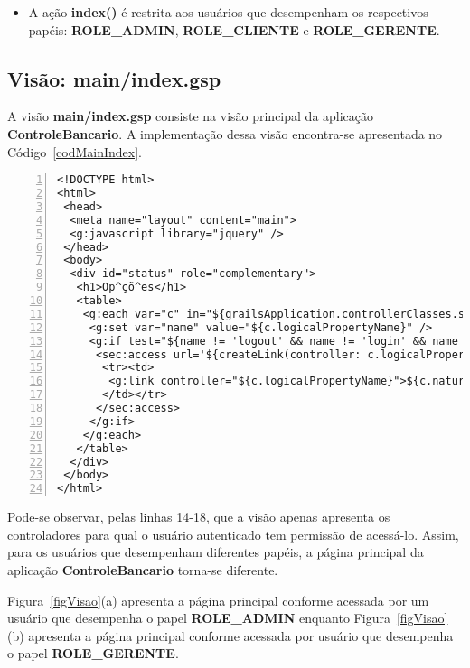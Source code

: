 \begin{itemize}

\item  A  ação  {\bf  index()}  é  restrita  aos  usuários  que  desempenham  os
  respectivos   papéis:   {\bf   ROLE\_ADMIN},   {\bf  ROLE\_CLIENTE}   e   {\bf
    ROLE\_GERENTE}.  

\end{itemize}

\subsection{Visão: main/index.gsp}

\vspace{0.5cm}

A  visão {\bf  main/index.gsp} consiste  na  visão principal  da aplicação  {\bf
  ControleBancario}.   A implementação  dessa visão  encontra-se  apresentada no
Código~\ref{codMainIndex}.  

\lstset{language=XML}
\begin{lstlisting}[numbers=left, caption=Visão {\bf main/index.gsp}, frame=trBL,
    float=htbp, label=codMainIndex] 
<!DOCTYPE html>
<html>
 <head>
  <meta name="layout" content="main">
  <g:javascript library="jquery" />
 </head>
 <body>
  <div id="status" role="complementary">
   <h1>Op^çõ^es</h1>
   <table>
    <g:each var="c" in="${grailsApplication.controllerClasses.sort { it.fullName } }">
     <g:set var="name" value="${c.logicalPropertyName}" />
     <g:if test="${name != 'logout' && name != 'login' && name != 'main'}">
      <sec:access url='${createLink(controller: c.logicalPropertyName, base: "/")}'>
       <tr><td>    
        <g:link controller="${c.logicalPropertyName}">${c.naturalName.replace(" Controller","")}</g:link>
       </td></tr>
      </sec:access>
     </g:if>
    </g:each>
   </table>
  </div>
 </body>
</html>
\end{lstlisting}

Pode-se  observar,  pelas  linhas  14-18,   que  a  visão  apenas  apresenta  os
controladores para qual o usuário autenticado tem permissão de acessá-lo. Assim,
para  os usuários  que  desempenham  diferentes papéis,  a  página principal  da
aplicação {\bf ControleBancario} torna-se diferente. 

\vspace{0.2cm}

Figura~\ref{figVisao}(a) apresenta  a página principal conforme  acessada por um
usuário    que     desempenha    o    papel     {\bf    ROLE\_ADMIN}    enquanto
Figura~\ref{figVisao}(b)  apresenta  a página  principal  conforme acessada  por
usuário que desempenha o papel {\bf ROLE\_GERENTE}.  

